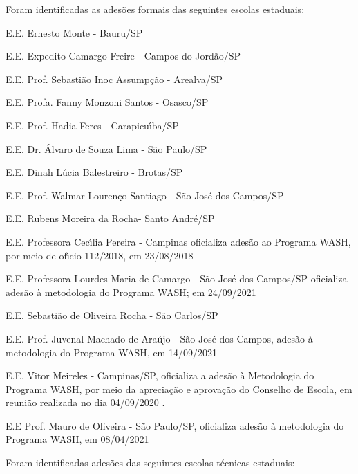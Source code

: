 \documentclass[
12pt,		%
openright,	%
twoside,  %
a4paper,			%
chapter=TITLE,		%
english,			%
french,				%
spanish,			%
brazil				%
]{USPSC-classe/USPSC}
\begin{document}
Foram identificadas as ades\~oes formais das seguintes escolas estaduais:










\begin{alineas}
\item E.E. Ernesto Monte - Bauru/SP
\item E.E. Expedito Camargo Freire - Campos do Jord\~ao/SP
\item E.E. Prof. Sebasti\~ao Inoc Assump\c{c}\~ao - Arealva/SP
\item E.E. Profa. Fanny Monzoni Santos - Osasco/SP
\item E.E. Prof. Hadia Feres - Carapicu\'{\i}ba/SP
\item E.E. Dr. \'Alvaro de Souza Lima - S\~ao Paulo/SP
\item E.E. Dinah L\'ucia Balestreiro - Brotas/SP  
\item E.E. Prof. Walmar Louren\c{c}o Santiago - S\~ao Jos\'e dos Campos/SP
\item E.E. Rubens Moreira da Rocha- Santo Andr\'e/SP
\item E.E. Professora Cec\'{\i}lia Pereira - Campinas oficializa ades\~ao ao Programa WASH, por meio de of\'{\i}cio 112/2018, em 23/08/2018
\item E.E. Professora Lourdes Maria de Camargo - S\~ao Jos\'e dos Campos/SP oficializa ades\~ao \`a metodologia do Programa WASH; em 24/09/2021
\item E.E. Sebasti\~ao de Oliveira Rocha - S\~ao Carlos/SP
\item E.E. Prof. Juvenal Machado de Ara\'ujo - S\~ao Jos\'e dos Campos, ades\~ao \`a metodologia do Programa WASH, em 14/09/2021
\item E.E. Vitor Meireles - Campinas/SP, oficializa a ades\~ao \`a Metodologia do Programa WASH, por meio da aprecia\c{c}\~ao e aprova\c{c}\~ao do Conselho de Escola, em reuni\~ao realizada no dia  04/09/2020 .
\item E.E Prof. Mauro de Oliveira - S\~ao Paulo/SP, oficializa ades\~ao \`a metodologia do Programa WASH, em 08/04/2021
\end{alineas}

Foram identificadas ades\~oes das seguintes escolas t\'ecnicas estaduais:
\end{document}
